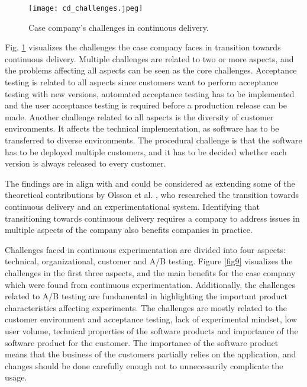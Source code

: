 \documentclass[english, grading]{tktltiki2}
\theoremstyle{definition}
\theoremstyle{remark}
\begin{document}
\begin{figure}[!htb]
	\centering
	\texttt{[image: cd\_challenges.jpeg]}
	\caption{Case company's challenges in continuous delivery.}
	\label{fig8}
\end{figure}

Fig. \ref{fig8} visualizes the challenges the case company faces in transition towards continuous delivery. Multiple challenges are related to two or more aspects, and the problems affecting all aspects can be seen as the core challenges. Acceptance testing is related to all aspects since customers want to perform acceptance testing with new versions, automated acceptance testing has to be implemented and the user acceptance testing is required before a production release can be made. Another challenge related to all aspects is the diversity of customer environments. It affects the technical implementation, as software has to be transferred to diverse environments. The procedural challenge is that the software has to be deployed multiple customers, and it has to be decided whether each version is always released to every customer. 

The findings are in align with and could be considered as extending some of the theoretical contributions by Olsson et al. \cite{olsson2012climbing}, who researched the transition towards continuous delivery and an experimentational system. Identifying that transitioning towards continuous delivery requires a company to address issues in multiple aspects of the company also benefits companies in practice.   







Challenges faced in continuous experimentation are divided into four aspects: technical, organizational, customer and A/B testing. Figure \ref{fig9} visualizes the challenges in the first three aspects, and the main benefits for the case company which were found from continuous experimentation. Additionally, the challenges related to A/B testing are fundamental in highlighting the important product characteristics affecting experiments. The challenges are mostly related to the customer environment and acceptance testing, lack of experimental mindset, low user volume, technical properties of the software products and importance of the software product for the customer. The importance of the software product means that the business of the customers partially relies on the application, and changes should be done carefully enough not to unnecessarily complicate the usage. 
\end{document}
